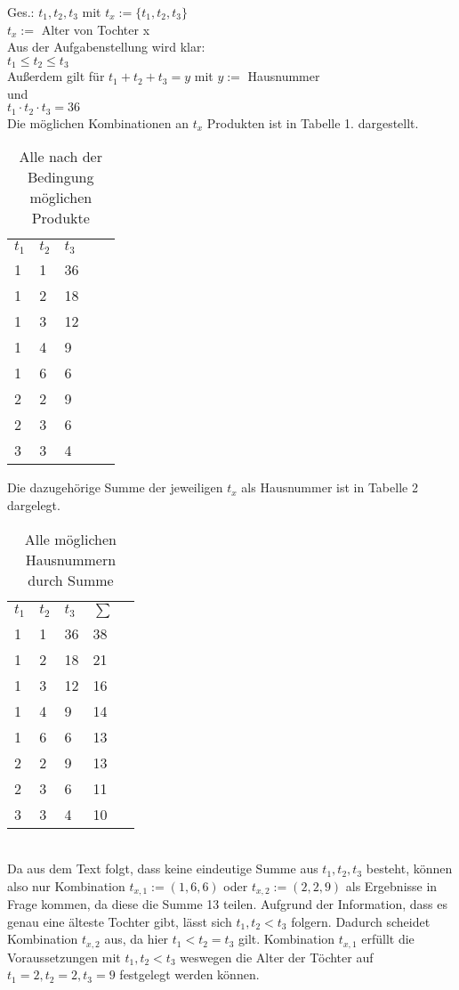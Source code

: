 \begin{lsg}
Ges.: $t_1,t_2,t_3$ mit $t_x:=\{t_1,t_2,t_3\}$\\
$t_x :=$ Alter von Tochter x \\
Aus der Aufgabenstellung wird klar:\\ $t_1 \le t_2 \le t_3$ \\
Außerdem gilt für $t_1+t_2+t_3=y$ mit $y:=$ Hausnummer \\und\\
$t_1\cdot t_2\cdot t_3 =36$ \\
Die möglichen Kombinationen an $t_x$ Produkten ist in Tabelle 1. dargestellt.
\begin{table}[h]
\centering
\begin{tabular}{lllll}
$t_1$ & $t_2$ & $t_3$ \\
 1 & 1  & 36    \\
 1 & 2 & 18  \\
 1 & 3 & 12   \\
 1 & 4 & 9    \\
 1 & 6 & 6   \\
 2 & 2 & 9    \\
 2 & 3 & 6    \\
 3 & 3 & 4   \\
\end{tabular}
\caption{Alle nach der Bedingung möglichen Produkte}
\end{table}

 \newpage

Die dazugehörige Summe der jeweiligen $t_x$ als Hausnummer ist in Tabelle 2 dargelegt.\\
\begin{table}[h]
\centering
\begin{tabular}{lllll}
$t_1$ & $t_2$ & $t_3$ & $\sum$\\
 1 & 1  & 36  & 38  \\
 1 & 2 & 18  & 21\\
 1 & 3 & 12  & 16\\
 1 & 4 & 9    & 14\\
 1 & 6 & 6  & 13 \\
 2 & 2 & 9   & 13 \\
 2 & 3 & 6   & 11 \\
 3 & 3 & 4   & 10\\
\end{tabular}
\caption{Alle möglichen Hausnummern durch Summe}
\end{table} \\
Da aus dem Text folgt, dass keine eindeutige Summe aus $t_1,t_2,t_3$ besteht, können also nur Kombination $t_{x,1}:=(1,6,6)$ oder $t_{x,2}:=(2,2,9)$ als Ergebnisse in Frage kommen, da diese die Summe 13 teilen. Aufgrund der Information, dass es genau eine älteste Tochter gibt, lässt sich $t_1,t_2 < t_3$ folgern. Dadurch scheidet Kombination $t_{x,2}$ aus, da hier $t_1 < t_2 = t_3$ gilt. Kombination $t_{x,1}$ erfüllt die Voraussetzungen mit $ t_1,t_2<t_3$ weswegen die Alter der Töchter auf $t_1=2, t_2=2, t_3=9$ festgelegt werden können.

\end{lsg}
 

